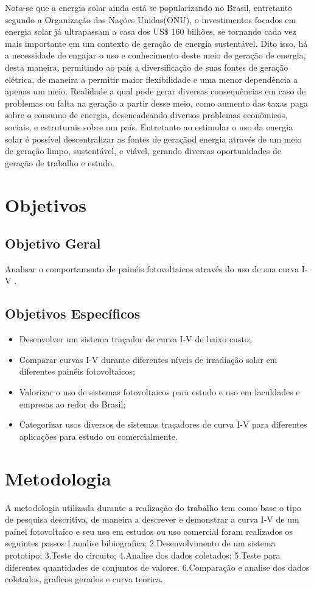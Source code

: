 \indent	Nota-se que a energia solar ainda está se popularizando no Brasil, entretanto segundo a Organização das Nações Unidas(ONU), o investimentos focados em energia solar já ultrapassam a casa dos US\$ 160 bilhões, se tornando cada vez mais importante em um contexto de geração de energia sustentável. Dito isso, há a necessidade de engajar o uso e conhecimento deste meio de geração de energia, desta maneira, permitindo ao país a diversificação de suas fontes de geração elétrica, de maneira a permitir maior flexibilidade e uma menor dependência a apenas um meio. 
\indent	Realidade a qual pode gerar diversas consequências em caso de problemas ou falta na geração a partir desse meio, como aumento das taxas paga sobre o consumo de energia, desencadeando diversos problemas econômicos, sociais, e estruturais sobre um país. Entretanto ao estimular o uso da energia solar é possível descentralizar as fontes de geraçãod energia através de um meio de geração limpo, sustentável, e viável, gerando diversas oportunidades de geração de trabalho e estudo.
\indent 


\section{Objetivos}

\subsection{Objetivo Geral}

Analisar o comportamento de painéis fotovoltaicos através do uso de sua curva I-V .

\subsection{Objetivos Específicos}
\begin{itemize}
	\item Desenvolver um sistema traçador de curva I-V de baixo custo;
	\item Comparar curvas I-V durante diferentes níveis de irradiação solar em diferentes painéis fotovoltaicos;
	\item Valorizar o uso de sistemas fotovoltaicos para estudo e uso em faculdades e empresas ao redor do Brasil;
	\item Categorizar usos diversos de sistemas traçadores de curva I-V para diferentes aplicações para estudo ou comercialmente.

\end{itemize}

\section{Metodologia}

A metodologia utilizada durante a realização do trabalho tem como base o tipo de pesquisa descritiva, de maneira a descrever e demonstrar a curva I-V de um painel fotovoltaico e seu uso em estudos ou uso comercial foram realizados os seguintes passos:1.analise bibiografica; 2.Desenvolvimento de um sistema prototipo; 3.Teste do circuito; 4.Analise dos dados coletados; 5.Teste para diferentes quantidades de conjuntos de valores. 6.Comparação e analise dos dados coletados, graficos gerados e curva teorica.
